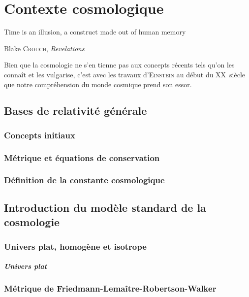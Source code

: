 \documentclass[../main/main.tex]{subfiles}
\begin{document}
\chapter{Contexte cosmologique}\label{cp:cosmo}

\epigraph{Time is an illusion, a construct made out of human memory}{Blake
\textsc{Crouch}, \textit{Revelations}}

\noindent Bien que la cosmologie ne s'en tienne pas aux concepts récents tels
qu'on les connaît et les vulgarise, c'est avec les travaux d'\textsc{Einstein}
au début du XX\ieme~siècle que notre compréhension du monde cosmique prend son
essor. 

\minitoc
\newpage

\section{Bases de relativité générale}\label{sec:11}

\subsection{Concepts initiaux}\label{ssec:RG}

\subsection{Métrique et équations de conservation}\label{ssec:112}

\subsection{Définition de la constante cosmologique}\label{ssec:lambda}

\section{Introduction du modèle standard de la cosmologie}\label{sec:MS}

\subsection{Univers plat, homogène et isotrope}\label{ssec:plat}

\paragraph*{Univers plat}
\lipsum[1]

\subsection{Métrique de Friedmann-Lemaître-Robertson-Walker}\label{ssec:FLRW}
\end{document}
